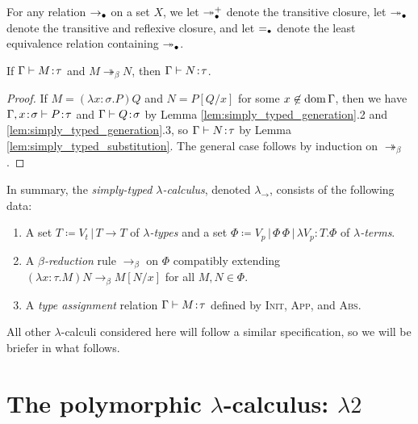 \documentclass[reqno]{amsart}
\begin{document}
    \begin{notation}
        For any relation $\rightarrow_\bullet$ on a set $X$, we let $\twoheadrightarrow_\bullet^+$ denote the transitive closure, let $\twoheadrightarrow_\bullet$ denote the transitive and reflexive closure, and let $=_\bullet$ denote the least equivalence relation containing $\twoheadrightarrow_\bullet$.
    \end{notation}

    \begin{theorem}\label{thm:simply_typed_subject_reduction}
        If $\Gamma\vdash M\!:\!\tau$ and $M\twoheadrightarrow_\beta N$, then $\Gamma\vdash N\!:\!\tau$.
    \end{theorem}
    \begin{proof}
        If $M=(\lambda x\!:\!\sigma.P)Q$ and $N=P[Q/x]$ for some $x\not\in\operatorname{dom}\Gamma$, then we have $\Gamma,x\!:\!\sigma\vdash P\!:\!\tau$ and $\Gamma\vdash Q\!:\!\sigma$ by Lemma \ref{lem:simply_typed_generation}.2 and \ref{lem:simply_typed_generation}.3, so $\Gamma\vdash N\!:\!\tau$ by Lemma \ref{lem:simply_typed_substitution}. The general case follows by induction on $\twoheadrightarrow_\beta$.
    \end{proof}

    In summary, the \textit{simply-typed $\lambda$-calculus}, denoted $\lambda_\rightarrow$, consists of the following data:
    \begin{enumerate}
        \item A set $T\coloneqq V_t\,|\,T\rightarrow T$ of \textit{$\lambda$-types} and a set $\Phi\coloneqq V_p\,|\,\Phi\,\Phi\,|\,\lambda V_p\!:\!T.\Phi$ of \textit{$\lambda$-terms}.
        \item A \textit{$\beta$-reduction} rule $\rightarrow_\beta$ on $\Phi$ compatibly extending $(\lambda x\!:\!\tau.M)N\rightarrow_\beta M[N/x]$ for all $M,N\in\Phi$.
        \item A \textit{type assignment} relation $\Gamma\vdash M\!:\!\tau$ defined by \textsc{Init}, \textsc{App}, and \textsc{Abs}.
    \end{enumerate}
    All other $\lambda$-calculi considered here will follow a similar specification, so we will be briefer in what follows.

    \section{The polymorphic $\lambda$-calculus: $\lambda2$}
\end{document}
